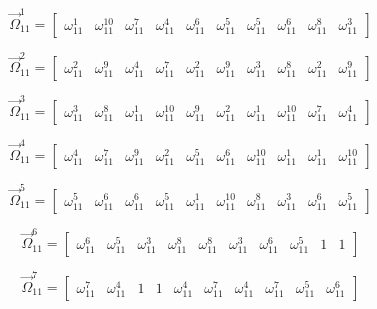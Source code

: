 \documentclass{article}
\begin{document}
\begin{enumerate}
\[ \overrightarrow{\Omega}_{11}^{1}=\left[ \begin{matrix} \omega_{11}^{1} & \omega_{11}^{10} & \omega_{11}^{7} & \omega_{11}^{4} & \omega_{11}^{6} & \omega_{11}^{5} & \omega_{11}^{5} & \omega_{11}^{6} & \omega_{11}^{8} & \omega_{11}^{3} \end{matrix} \right] \]

\[ \overrightarrow{\Omega}_{11}^{2}=\left[ \begin{matrix} \omega_{11}^{2} & \omega_{11}^{9} & \omega_{11}^{4} & \omega_{11}^{7} & \omega_{11}^{2} & \omega_{11}^{9} & \omega_{11}^{3} & \omega_{11}^{8} & \omega_{11}^{2} & \omega_{11}^{9} \end{matrix} \right] \]

\[ \overrightarrow{\Omega}_{11}^{3}=\left[ \begin{matrix} \omega_{11}^{3} & \omega_{11}^{8} & \omega_{11}^{1} & \omega_{11}^{10} & \omega_{11}^{9} & \omega_{11}^{2} & \omega_{11}^{1} & \omega_{11}^{10} & \omega_{11}^{7} & \omega_{11}^{4} \end{matrix} \right] \]

\[ \overrightarrow{\Omega}_{11}^{4}=\left[ \begin{matrix} \omega_{11}^{4} & \omega_{11}^{7} & \omega_{11}^{9} & \omega_{11}^{2} & \omega_{11}^{5} & \omega_{11}^{6} & \omega_{11}^{10} & \omega_{11}^{1} & \omega_{11}^{1} & \omega_{11}^{10} \end{matrix} \right] \]

\[ \overrightarrow{\Omega}_{11}^{5}=\left[ \begin{matrix} \omega_{11}^{5} & \omega_{11}^{6} & \omega_{11}^{6} & \omega_{11}^{5} & \omega_{11}^{1} & \omega_{11}^{10} & \omega_{11}^{8} & \omega_{11}^{3} & \omega_{11}^{6} & \omega_{11}^{5} \end{matrix} \right] \]

\[ \overrightarrow{\Omega}_{11}^{6}=\left[ \begin{matrix} \omega_{11}^{6} & \omega_{11}^{5} & \omega_{11}^{3} & \omega_{11}^{8} & \omega_{11}^{8} & \omega_{11}^{3} & \omega_{11}^{6} & \omega_{11}^{5} & 1 & 1 \end{matrix} \right] \]

\[ \overrightarrow{\Omega}_{11}^{7}=\left[ \begin{matrix} \omega_{11}^{7} & \omega_{11}^{4} & 1 & 1 & \omega_{11}^{4} & \omega_{11}^{7} & \omega_{11}^{4} & \omega_{11}^{7} & \omega_{11}^{5} & \omega_{11}^{6} \end{matrix} \right] \]


\end{enumerate}
\end{document}
